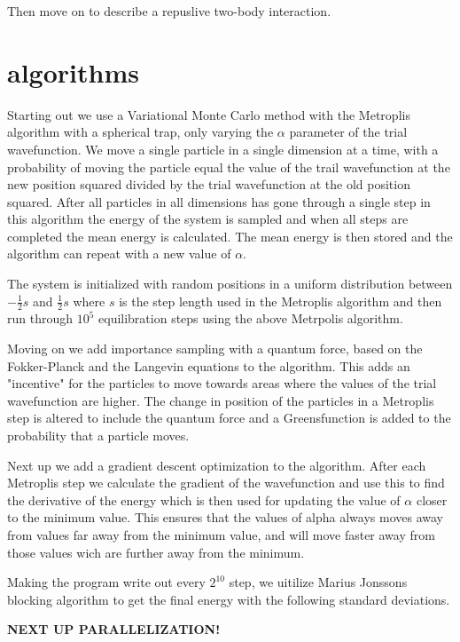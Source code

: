 \documentclass[a4paper, 10pt, english]{revtex4-2} %
\begin{document}
    Then move on to describe a repuslive two-body interaction.

\section*{\large algorithms}
    Starting out we use a Variational Monte Carlo method with the Metroplis algorithm with a spherical trap, only varying the $\alpha$ parameter of the trial wavefunction.
    We move a single particle in a single dimension at a time, with a probability of moving the particle equal the value of the trail wavefunction at the new position squared divided by the trial wavefunction at the old position squared.
    After all particles in all dimensions has gone through a single step in this algorithm the energy of the system is sampled and when all steps are completed the mean energy is calculated.
    The mean energy is then stored and the algorithm can repeat with a new value of $\alpha$.

    The system is initialized with random positions in a uniform distribution between $-\frac{1}{2}s$ and $\frac{1}{2}s$ where $s$ is the step length used in the Metroplis algorithm and then run through $10^5$ equilibration steps using the above Metrpolis algorithm.


    Moving on we add importance sampling with a quantum force, based on the Fokker-Planck and the Langevin equations to the algorithm.
    This adds an "incentive" for the particles to move towards areas where the values of the trial wavefunction are higher.
    The change in position of the particles in a Metroplis step is altered to include the quantum force and a Greensfunction is added to the probability that a particle moves.

    Next up we add a gradient descent optimization to the algorithm.
    After each Metroplis step we calculate the gradient of the wavefunction and use this to find the derivative of the energy which is then used for updating the value of $\alpha$ closer to the minimum value.
    This ensures that the values of alpha always moves away from values far away from the minimum value, and will move faster away from those values wich are further away from the minimum.

    Making the program write out every $2^{10}$ step, we uitilize Marius Jonssons blocking algorithm to get the final energy with the following standard deviations.

    \textbf{NEXT UP PARALLELIZATION!}
\end{document}

